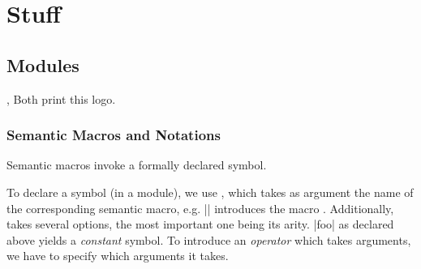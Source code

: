 

\chapter{Stuff}

\section{Modules}


\begin{function}{\sTeX , \stex}
  Both print this \stex logo.
\end{function}

 \subsection{Semantic Macros and Notations}

 Semantic macros invoke a formally declared symbol.

 To declare a symbol (in a module), we use ,
 which takes as argument the name of the corresponding
 semantic macro, e.g. || introduces the macro
 . Additionally,  takes several options,
 the most important one being its arity. |foo| as declared above
 yields a \emph{constant} symbol. To introduce an \emph{operator}
 which takes arguments, we have to specify which arguments it takes.

